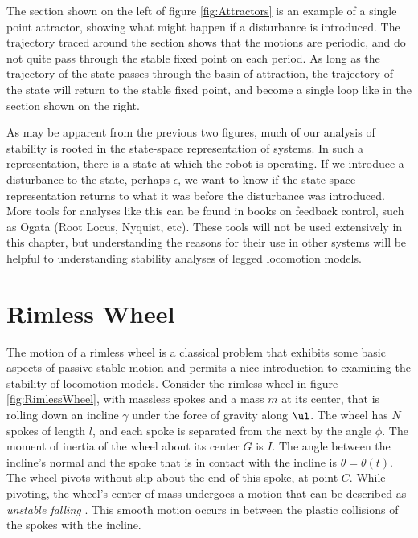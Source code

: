 
The section shown on the left of figure \ref{fig:Attractors} is an example of a
single point attractor, showing what might happen if a disturbance is
introduced. The trajectory traced around the section shows that the motions are
periodic, and do not quite pass through the stable fixed point on each period.
As long as the trajectory of the state passes through the basin of attraction,
the trajectory of the state will return to the stable fixed point, and become a
single loop like in the section shown on the right. 

As may be apparent from the previous two figures, much of our analysis of
stability is rooted in the state-space representation of systems. In such a
representation, there is a state at which the robot is operating. If we
introduce a disturbance to the state, perhaps $\epsilon$, we want to know if
the state space representation returns to what it was before the disturbance
was introduced. More tools for analyses like this can be found in books on
feedback control, such as Ogata \cite{ogata09} (Root Locus, Nyquist, etc).
These tools will not be used extensively in this chapter, but understanding the
reasons for their use in other systems will be helpful to understanding
stability analyses of legged locomotion models. 


\section{Rimless Wheel} %
\label{sec:RimlessWheel}

The motion of a rimless wheel is a classical problem that exhibits some basic
aspects of passive stable motion and permits a nice introduction to examining
the stability of locomotion models. Consider the rimless wheel in figure
\ref{fig:RimlessWheel}, with massless spokes and a mass $m$ at its center, that
is rolling down an incline $\gamma$ under the force of gravity along $\ul$. The
wheel has $N$ spokes of length $l$, and each spoke is separated from the next
by the angle $\phi$. The moment of inertia of the wheel about its center $G$ is
$I$. The angle between the incline's normal and the spoke that is in contact
with the incline is $\theta = \theta(t)$. The wheel pivots without slip about
the end of this spoke, at point $C$. While pivoting, the wheel's center of mass
undergoes a motion that can be described as \textit{unstable falling}
\cite{coleman96}. This smooth motion occurs in between the plastic collisions
of the spokes with the incline.

